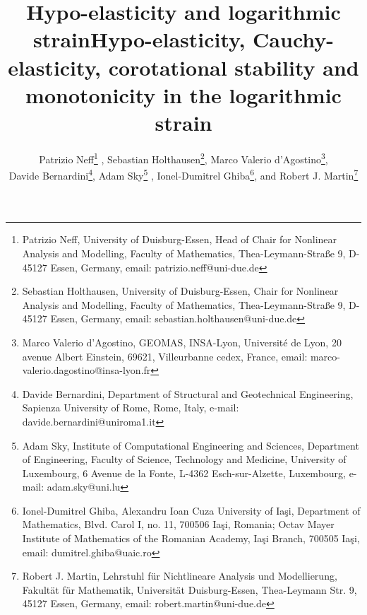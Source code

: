 \documentclass[10pt]{article}
\title{Hypo-elasticity and logarithmic strain}
\numberwithin{theoremCounter}{section}
\theoremstyle{plain}
\theoremstyle{definition}
\numberwithin{equation}{section}
\begin{document}
\title{Hypo-elasticity, Cauchy-elasticity, corotational stability and monotonicity in the logarithmic strain}
\author{
Patrizio Neff\thanks{
Patrizio Neff, University of Duisburg-Essen, Head of Chair for Nonlinear Analysis and Modelling, Faculty of Mathematics, Thea-Leymann-Stra{\ss}e 9,
D-45127 Essen, Germany, email: patrizio.neff@uni-due.de}
, \qquad
Sebastian Holthausen\thanks{
Sebastian Holthausen, University of Duisburg-Essen, Chair for Nonlinear Analysis and Modelling,  Faculty of Mathematics, Thea-Leymann-Stra{\ss}e 9,
D-45127 Essen, Germany, email: sebastian.holthausen@uni-due.de
}, \qquad
Marco Valerio d'Agostino\thanks{
Marco Valerio d'Agostino, GEOMAS, INSA-Lyon, Université de Lyon, 20 avenue Albert Einstein, 69621, Villeurbanne cedex, France, email: marco-valerio.dagostino@insa-lyon.fr
}, \\[0.8em]
Davide Bernardini\thanks{
Davide Bernardini, Department of Structural and Geotechnical Engineering, Sapienza University of Rome, Rome, Italy, e-mail: davide.bernardini@uniroma1.it
}, \quad
Adam Sky\thanks{
Adam Sky, Institute of Computational Engineering and Sciences, Department of Engineering, Faculty of Science, Technology and Medicine, University of Luxembourg, 6 Avenue de la Fonte, L-4362 Esch-sur-Alzette, Luxembourg, e-mail: adam.sky@uni.lu
}%
, \quad
Ionel-Dumitrel Ghiba\thanks{
Ionel-Dumitrel Ghiba, Alexandru Ioan Cuza University of Ia\c si, Department of Mathematics,  Blvd. Carol I, no. 11, 700506 Ia\c si, Romania;  Octav Mayer Institute of Mathematics
of the Romanian Academy, Ia\c si Branch, 700505 Ia\c si, email: dumitrel.ghiba@uaic.ro
}, \quad and \quad
Robert J. Martin\thanks{
Robert J. Martin,  Lehrstuhl für Nichtlineare Analysis und Modellierung, Fakultät für Mathematik, Universität Duisburg-Essen, Thea-Leymann Str. 9, 45127 Essen, Germany, email: robert.martin@uni-due.de
}
}
\maketitle
%
\vspace{-0,6cm}
\end{document}
